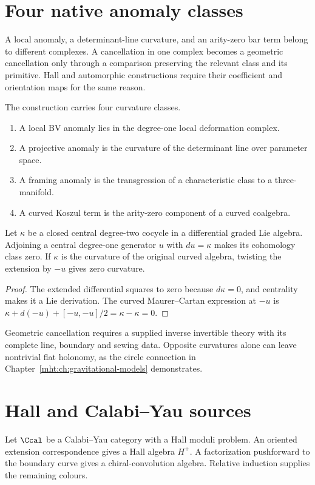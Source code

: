 \chapter{Four native anomaly classes}
A local anomaly, a determinant-line curvature, and an arity-zero bar term belong to different complexes. A cancellation in one complex becomes a geometric cancellation only through a comparison preserving the relevant class and its primitive. Hall and automorphic constructions require their coefficient and orientation maps for the same reason.

The construction carries four curvature classes.
\begin{enumerate}
\item A local BV anomaly lies in the degree-one local deformation complex.
\item A projective anomaly is the curvature of the determinant line over parameter space.
\item A framing anomaly is the transgression of a characteristic class to a three-manifold.
\item A curved Koszul term is the arity-zero component of a curved coalgebra.
\end{enumerate}

\begin{theorem}
Let $\kappa$ be a closed central degree-two cocycle in a
differential graded Lie algebra.
Adjoining a central degree-one generator $u$ with $du=\kappa$
makes its cohomology class zero.
If $\kappa$ is the curvature of the original curved algebra,
twisting the extension by $-u$ gives zero curvature.
\end{theorem}
\begin{proof}
The extended differential squares to zero because $d\kappa=0$,
and centrality makes it a Lie derivation.
The curved Maurer--Cartan expression at $-u$ is
$\kappa+d(-u)+[-u,-u]/2=\kappa-\kappa=0$.
\end{proof}

Geometric cancellation requires a supplied inverse invertible
theory with its complete line, boundary and sewing data.
Opposite curvatures alone can leave nontrivial flat holonomy,
as the circle connection in
Chapter~\ref{mht:ch:gravitational-models} demonstrates.

\chapter{Hall and Calabi--Yau sources}
Let $\Ccal$ be a Calabi--Yau category with a Hall moduli problem.  An oriented extension correspondence gives a Hall algebra $H^+$.  A factorization pushforward to the boundary curve gives a chiral-convolution algebra.  Relative induction supplies the remaining colours.

